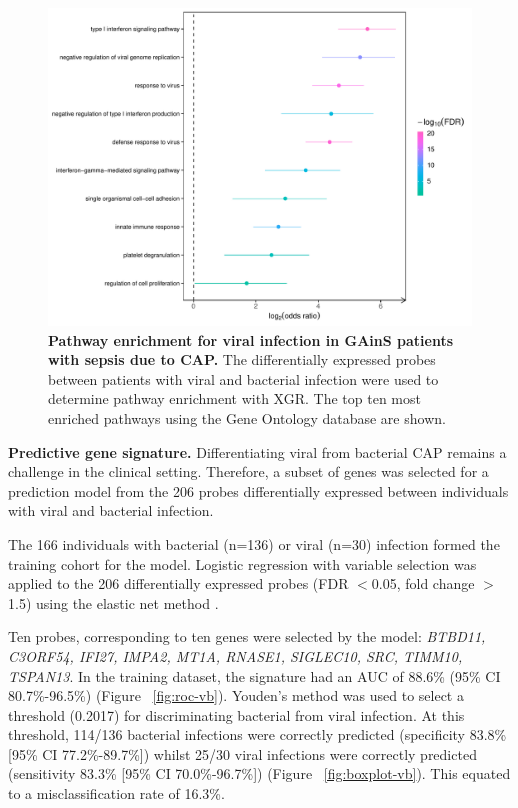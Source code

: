 \FloatBarrier
\begin{figure}[htbp]
\centering
\includegraphics[width=\textwidth]{./Results3/Images/xgr-viral.pdf}
\caption[Pathway analysis for viral infection]{\textbf{Pathway enrichment for viral infection in GAinS patients with sepsis due to CAP.} The differentially expressed probes between patients with viral and bacterial infection were used to determine pathway enrichment with XGR. The top ten most enriched pathways using the Gene Ontology database are shown.}
\label{fig:xgr-viral}
\end{figure}
\FloatBarrier
 
 \textbf{Predictive gene signature.} Differentiating viral from bacterial CAP remains a challenge in the clinical setting. Therefore, a subset of genes was selected for a prediction model from the 206 probes differentially expressed between individuals with viral and bacterial infection. 
 
The 166 individuals with bacterial (n=136) or viral (n=30) infection formed the training cohort for the model. Logistic regression with variable selection was applied to the 206 differentially expressed probes (FDR $<$0.05, fold change $>$1.5) using the elastic net method \parencite{Zou2005} \parencite{Herberg2016}. 
 
Ten probes, corresponding to ten genes were selected by the model: \textit{BTBD11, C3ORF54, IFI27, IMPA2, MT1A, RNASE1, SIGLEC10, SRC, TIMM10, TSPAN13}. In the training dataset, the signature had an AUC of 88.6\% (95\% CI 80.7\%-96.5\%) (Figure ~\ref{fig:roc-vb}). Youden's method was used to select a threshold (0.2017) for discriminating bacterial from viral infection. At this threshold, 114/136 bacterial infections were correctly predicted (specificity 83.8\% [95\% CI 77.2\%-89.7\%]) whilst 25/30 viral infections were correctly predicted (sensitivity 83.3\% [95\% CI 70.0\%-96.7\%]) (Figure ~\ref{fig:boxplot-vb}). This equated to a misclassification rate of 16.3\%.
 
